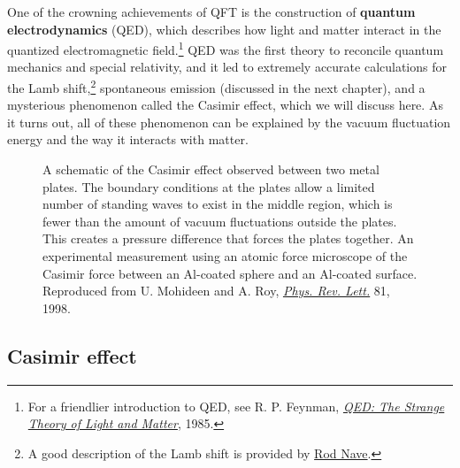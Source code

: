 One of the crowning achievements of QFT is the construction of \textbf{quantum electrodynamics} (QED), which describes how light and matter interact in the quantized electromagnetic field.\footnote{For a friendlier introduction to QED, see R. P. Feynman, \href{https://en.wikipedia.org/wiki/QED:_The_Strange_Theory_of_Light_and_Matter}{\emph{QED: The Strange Theory of Light and Matter}}, 1985.} 
QED was the first theory to reconcile quantum mechanics and special relativity, and it led to extremely accurate calculations for the Lamb shift,\footnote{A good description of the Lamb shift is provided by \href{http://hyperphysics.phy-astr.gsu.edu/hbase/quantum/lamb.html}{Rod Nave}.} spontaneous emission (discussed in the next chapter), and a mysterious phenomenon called the Casimir effect, which we will discuss here. 
As it turns out, all of these phenomenon can be explained by the vacuum fluctuation energy and the way it interacts with matter.

\begin{figure}[!h]
	\centering
	 \hspace{2ex}
	\caption{\protect{} A schematic of the Casimir effect observed between two metal plates. 
	The boundary conditions at the plates allow a limited number of standing waves to exist in the middle region, which is fewer than the amount of vacuum fluctuations outside the plates. 
	This creates a pressure difference that forces the plates together. 
	\protect{} An experimental measurement using an atomic force microscope of the Casimir force between an Al-coated sphere and an Al-coated surface. 
	Reproduced from U. Mohideen and A. Roy, \href{https://journals.aps.org/prl/abstract/10.1103/PhysRevLett.81.4549}{\emph{Phys. Rev. Lett.}} 81, 1998.}
	\label{fig:casimir}
\end{figure}


\subsection{Casimir effect}

